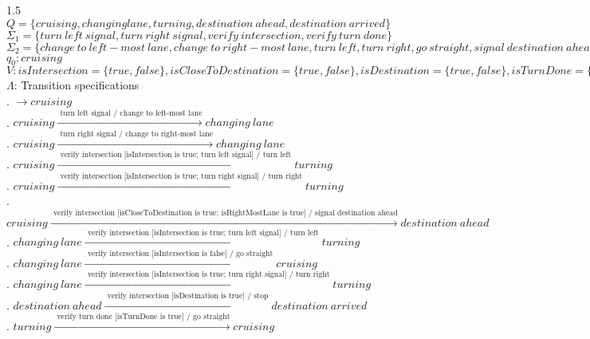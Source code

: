 \documentclass[12pt]{article}
\begin{document}
\begin{spacing}{1.5}
\noindent $Q = \{cruising, changing lane, turning, destination~ahead, destination~arrived\}$\\
\noindent $\Sigma_1 = \{turn~left~signal, turn~right~signal, verify~intersection, verify~turn~done\}$\\
\noindent $\Sigma_2 = \{change~to~left-most~lane, change~to~right-most~lane, turn~left, turn~right, go~straight, signal~destination~ahead, stop\}$\\
\noindent $q_0: cruising$\\
\noindent $V: isIntersection = \{true, false\}, isCloseToDestination = \{true, false\}, isDestination = \{true, false\}, isTurnDone = \{true, false\}, isRightMostLane = \{true, false\}$\\
\noindent $\Lambda$: Transition specifications\\
. $\rightarrow cruising$\\
. $cruising \xrightarrow {\text { turn~left~signal / change~to~left-most~lane}} changing~lane$\\
. $cruising \xrightarrow {\text { turn~right~signal / change~to~right-most~lane}} changing~lane$\\
. $cruising \xrightarrow {\text { verify~intersection [isIntersection~is~true; turn~left~signal] / turn~left}} turning$\\
. $cruising \xrightarrow {\text { verify~intersection [isIntersection~is~true; turn~right~signal] / turn~right}} turning$\\
. $cruising \xrightarrow {\text { verify~intersection [isCloseToDestination~is~true; isRightMostLane~is~true] / signal~destination~ahead}} destination~ahead$\\
. $changing~lane \xrightarrow {\text { verify~intersection [isIntersection~is~true; turn~left~signal] / turn~left}} turning$\\
. $changing~lane \xrightarrow {\text { verify~intersection [isIntersection~is~false] / go~straight}} cruising$\\
. $changing~lane \xrightarrow {\text { verify~intersection [isIntersection~is~true; turn~right~signal] / turn right}} turning$\\
. $destination~ahead \xrightarrow {\text { verify~intersection [isDestination~is~true] / stop}} destination~arrived$\\
. $turning \xrightarrow {\text { verify~turn~done [isTurnDone~is~true] / go straight}} cruising$\\


\end{spacing}
\end{document}
